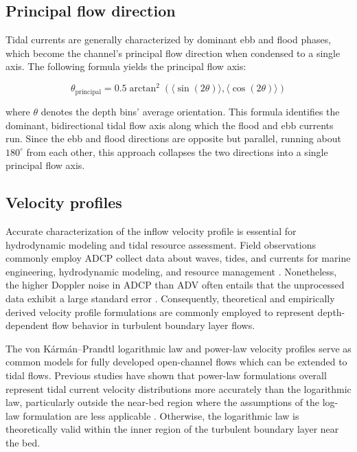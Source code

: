 \documentclass[12pt,sort&compress]{elsarticle}
\theoremstyle{definition}%
\begin{document}
\subsection{Principal flow direction}
\label{subsec:2.2}

\noindent Tidal currents are generally characterized by dominant ebb and flood phases, which become the channel's principal flow direction when condensed to a single axis. The following formula yields the principal flow axis:

\[
\theta_{\text{principal}}
=
0.5
\arctan^2
\left(
\langle \sin(2\theta)\rangle,
\langle \cos(2\theta)\rangle
\right)
\]

where \(\theta\) denotes the depth bins' average orientation. This formula identifies the dominant, bidirectional tidal flow axis along which the flood and ebb currents run. Since the ebb and flood directions are opposite but parallel, running about \(180^{\circ}\) from each other, this approach collapses the two directions into a single principal flow axis.

\subsection{Velocity profiles}
\label{subsec:2.3}

\noindent Accurate characterization of the inflow velocity profile is essential for hydrodynamic modeling and tidal resource assessment. Field observations commonly employ ADCP collect data about waves, tides, and  currents for marine engineering, hydrodynamic modeling, and resource management \cite{[thomson_2012],[kakarla_2023]}. Nonetheless, the higher Doppler noise in ADCP than ADV often entails that the unprocessed data exhibit a large standard error  \cite{[thomson_2010],[thomson_2012]}. Consequently, theoretical and empirically derived velocity profile formulations are commonly employed to represent depth-dependent flow behavior in turbulent boundary layer flows. 

The von K\'arm\'an--Prandtl logarithmic law and power-law velocity profiles serve as common models for fully developed open-channel flows which can be extended to tidal flows. Previous studies have shown that power-law formulations overall represent tidal current velocity distributions more accurately than the logarithmic law, particularly outside the near-bed region where the assumptions of the log-law formulation are less applicable \cite{jang_current_2026}. Otherwise, the logarithmic law is theoretically valid within the inner region of the turbulent boundary layer near the bed.
\end{document}
